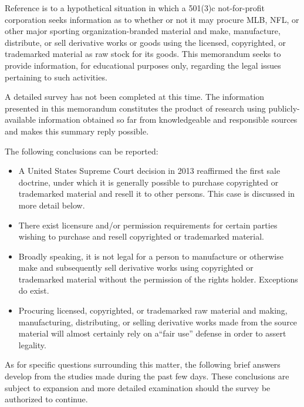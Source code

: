 \documentclass[letterpaper,11pt]{texMemo}
\begin{document}
\maketitle


  Reference is to a hypothetical situation in which a 501(3)c not-for-profit corporation seeks information as to whether or not it may procure MLB, NFL, or other major sporting organization-branded material and make, manufacture, distribute, or sell derivative works or goods using the licensed, copyrighted, or trademarked material as raw stock for its goods. This memorandum seeks to provide information, for educational purposes only, regarding the legal issues pertaining to such activities.

  A detailed survey has not been completed at this time. The information presented in this memorandum constitutes the product of research using publicly-available information obtained so far from knowledgeable and responsible sources and makes this summary reply possible.

  The following conclusions can be reported:

  \begin{itemize}
   \item A United States Supreme Court decision in 2013 reaffirmed the first sale doctrine, under which it is generally possible to purchase copyrighted or trademarked material and resell it to other persons. This case is discussed in more detail below.
   \item There exist licensure and/or permission requirements for certain parties wishing to purchase and resell copyrighted or trademarked material.
   \item Broadly speaking, it is not legal for a person to manufacture or otherwise make and subsequently sell derivative works using copyrighted or trademarked material without the permission of the rights holder. Exceptions do exist.
   \item Procuring licensed, copyrighted, or trademarked raw material and making, manufacturing, distributing, or selling derivative works made from the source material will almost certainly rely on a``fair use'' defense in order to assert legality.
  \end{itemize}

  As for specific questions surrounding this matter, the following brief answers develop from the studies made during the past few days. These conclusions are subject to expansion and more detailed examination should the survey be authorized to continue.
\end{document}
